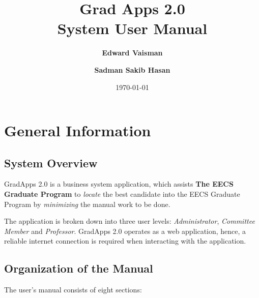 \documentclass[fontsize=12pt,paper=letter,twoside]{scrartcl}
\author{\textbf{Edward Vaisman}
\and \textbf{Sadman Sakib Hasan}
}
\date{\today} %
\begin{document}
\title{Grad Apps 2.0 \\ System User Manual}
\maketitle

\newpage

\tableofcontents

\newpage



\section{General Information}

\subsection{System Overview}

GradApps 2.0 is a business system application, which assists \textbf{The EECS Graduate Program} to \emph{locate} the best candidate into the EECS Graduate Program by \emph{minimizing} the manual work to be done.

\bigskip
\noindent The application is broken down into three user levels: \emph{Administrator}, \emph{Committee Member} and \emph{Professor}. GradApps 2.0 operates as a web application, hence, a reliable internet connection is required when interacting with the application.

\subsection{Organization of the Manual}
The user’s manual consists of eight sections:
\end{document}
